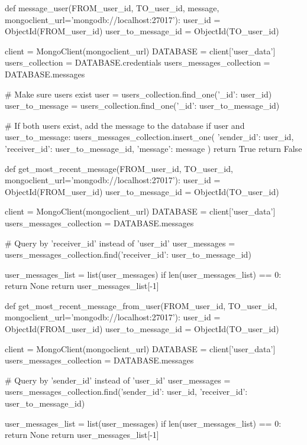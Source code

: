 \documentclass[12pt]{article} %
\begin{document}
\begin{pythoncode}[caption={Messaging Functions for MongoDB}]
    def message_user(FROM_user_id, TO_user_id, message, mongoclient_url='mongodb://localhost:27017'):
        user_id = ObjectId(FROM_user_id)
        user_to_message_id = ObjectId(TO_user_id)
    
        client = MongoClient(mongoclient_url)
        DATABASE = client['user_data']
        users_collection = DATABASE.credentials
        users_messages_collection = DATABASE.messages
        
        # Make sure users exist
        user = users_collection.find_one({'_id': user_id})
        user_to_message = users_collection.find_one({'_id': user_to_message_id})
    
        # If both users exist, add the message to the database
        if user and user_to_message:
            users_messages_collection.insert_one({
                'sender_id': user_id,
                'receiver_id': user_to_message_id,
                'message': message
            })
            return True
        return False
    
    def get_most_recent_message(FROM_user_id, TO_user_id, mongoclient_url='mongodb://localhost:27017'):
        user_id = ObjectId(FROM_user_id)
        user_to_message_id = ObjectId(TO_user_id)
    
        client = MongoClient(mongoclient_url)
        DATABASE = client['user_data']
        users_messages_collection = DATABASE.messages
        
        # Query by 'receiver_id' instead of 'user_id'
        user_messages = users_messages_collection.find({'receiver_id': user_to_message_id})
        
        user_messages_list = list(user_messages)
        if len(user_messages_list) == 0:
            return None
        return user_messages_list[-1]
    
    def get_most_recent_message_from_user(FROM_user_id, TO_user_id, mongoclient_url='mongodb://localhost:27017'):
        user_id = ObjectId(FROM_user_id)
        user_to_message_id = ObjectId(TO_user_id)
    
        client = MongoClient(mongoclient_url)
        DATABASE = client['user_data']
        users_messages_collection = DATABASE.messages
        
        # Query by 'sender_id' instead of 'user_id'
        user_messages = users_messages_collection.find({'sender_id': user_id, 'receiver_id': user_to_message_id})
        
        user_messages_list = list(user_messages)
        if len(user_messages_list) == 0:
            return None
        return user_messages_list[-1]
    

\end{pythoncode}
\end{document}
